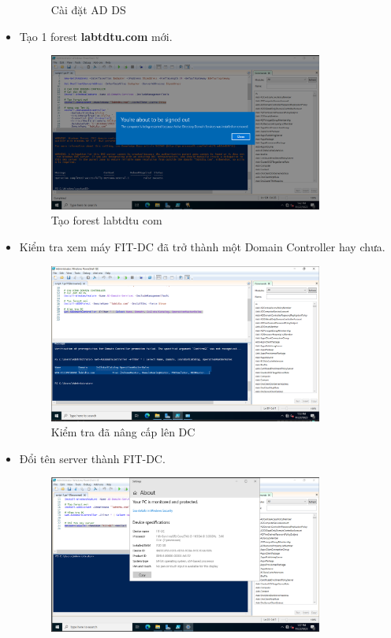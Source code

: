 \documentclass[13pt]{report}
\begin{document}
\begin{itemize}
\begin{figure}[htp]
			\caption{Cài đặt AD DS}
		\end{figure}
		\item Tạo 1 forest  \textbf{labtdtu.com} mới.
		\begin{figure}[htp]
			\centering
			\includegraphics[width=0.85\textwidth]{image/PowerShell/ADDC/4.png}
			\caption{Tạo forest labtdtu com}
		\end{figure}
		\newpage
		\item Kiểm tra xem máy FIT-DC đã trở thành một Domain Controller hay chưa.
		\begin{figure}[htp]
			\centering
			\includegraphics[width=0.85\textwidth]{image/PowerShell/ADDC/5.png}
			\caption{Kiểm tra đã nâng cấp lên DC}
		\end{figure}
		\item Đổi tên server thành FIT-DC.
		\begin{figure}[htp]
			\centering
			\includegraphics[width=0.85\textwidth]{image/PowerShell/ADDC/6.png}

\end{figure}
\end{itemize}
\end{document}
